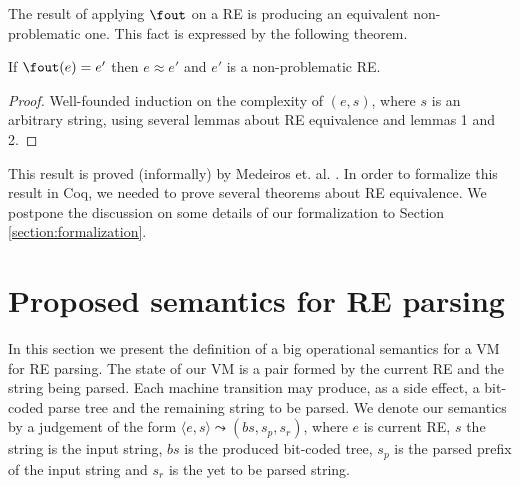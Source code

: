 The result of applying $\fout$ on a RE is producing an equivalent non-problematic one. This fact is expressed
by the following theorem. 



\begin{Theorem}
   If $\fout(e) = e'$ then $e \approx e'$ and $e'$ is a non-problematic RE.
\end{Theorem}
\begin{proof}
   Well-founded induction on the complexity of $(e,s)$, where $s$ is an arbitrary string, using
   several lemmas about RE equivalence and lemmas 1 and 2.
\end{proof}



This result is proved (informally) by Medeiros et. al. \cite{Medeiros14}. In order to formalize this result
in Coq, we needed to prove several theorems about RE equivalence. We postpone the discussion on some details
of our formalization to Section \ref{section:formalization}.


\section{Proposed semantics for RE parsing}


\label{section:semantics}


In this section we present the definition of a big operational semantics for a VM for RE parsing.
The state of our VM is a pair formed by the current RE and the string being parsed. Each machine 
transition may produce, as a side effect, a bit-coded parse tree and the remaining string to be 
parsed. We denote our semantics by a judgement of the form $\langle e, s \rangle \leadsto (bs,s_p,s_r)$,
where $e$ is current RE, $s$ the string is the input string, $bs$ is the produced bit-coded tree, $s_p$ is
the parsed prefix of the input string and $s_r$ is the yet to be parsed string.



